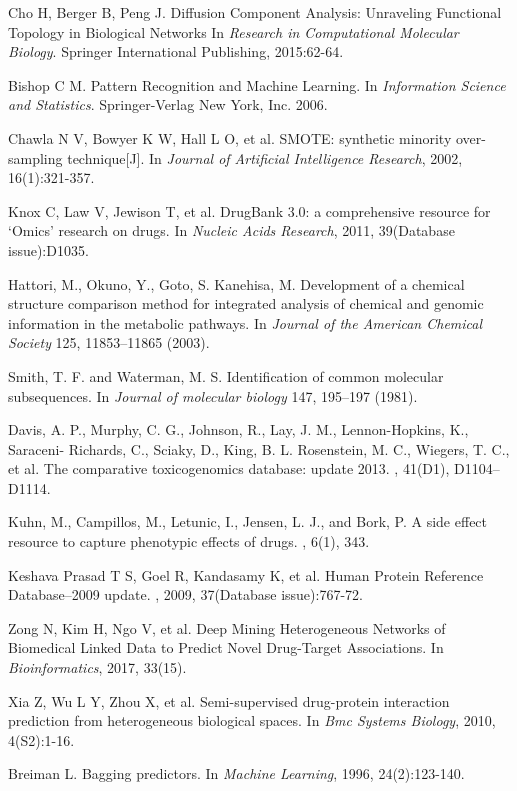\documentclass[journal]{IEEEtran}
\begin{document}
\begin{thebibliography}{10}
Cho H, Berger B, Peng J. 
\newblock Diffusion Component Analysis: Unraveling Functional Topology in Biological Networks
\newblock In {\em Research in Computational Molecular Biology}. Springer International Publishing, 2015:62-64.


Bishop C M. 
\newblock Pattern Recognition and Machine Learning. 
\newblock In {\em Information Science and Statistics}. Springer-Verlag New York, Inc. 2006.

Chawla N V, Bowyer K W, Hall L O, et al. \newblock SMOTE: synthetic minority over-sampling technique[J].
\newblock In {\em Journal of Artificial Intelligence Research}, 2002, 16(1):321-357.

Knox C, Law V, Jewison T, et al. 
\newblock DrugBank 3.0: a comprehensive resource for ‘Omics’ research on drugs. 
\newblock In {\em Nucleic Acids Research}, 2011, 39(Database issue):D1035.

Hattori, M., Okuno, Y., Goto, S.  Kanehisa, M.
\newblock Development of a chemical structure comparison method for integrated analysis of chemical and genomic information in the metabolic pathways. 
\newblock In {\em Journal of the American Chemical Society} 125, 11853–11865 (2003).


Smith, T. F. and Waterman, M. S. 
\newblock Identification of common molecular subsequences. 
\newblock In {\em Journal of molecular biology} 147, 195–197 (1981).


Davis, A. P., Murphy, C. G., Johnson, R., Lay, J. M., Lennon-Hopkins, K., Saraceni- Richards, C., Sciaky, D., King, B. L. Rosenstein, M. C., Wiegers, T. C., et al. 
\newblock The comparative toxicogenomics database: update 2013.
, 41(D1), D1104–D1114.


Kuhn, M., Campillos, M., Letunic, I., Jensen, L. J., and Bork, P.  
\newblock A side effect resource to capture phenotypic effects of drugs. 
, 6(1), 343.

Keshava Prasad T S, Goel R, Kandasamy K, et al. 
\newblock Human Protein Reference Database--2009 update.
, 2009, 37(Database issue):767-72.


Zong N, Kim H, Ngo V, et al. 
\newblock Deep Mining Heterogeneous Networks of Biomedical Linked Data to Predict Novel Drug-Target Associations. 
\newblock In {\em Bioinformatics}, 2017, 33(15).




Xia Z, Wu L Y, Zhou X, et al. 
\newblock Semi-supervised drug-protein interaction prediction from heterogeneous biological spaces. 
\newblock In {\em Bmc Systems Biology}, 2010, 4(S2):1-16.


Breiman L. 
\newblock Bagging predictors. 
\newblock In {\em Machine Learning}, 1996, 24(2):123-140.

\end{thebibliography}
\end{document}
